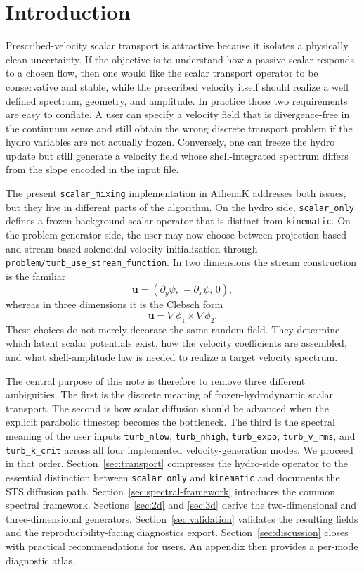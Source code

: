 \documentclass[twocolumn]{aastex7}
\newcommand{\code}[1]{\texttt{#1}}
\newcommand{\SO}{\code{scalar\_only}\xspace}
\newcommand{\kin}{\code{kinematic}\xspace}
\begin{document}
\section{Introduction}
Prescribed-velocity scalar transport is attractive because it isolates a physically clean uncertainty. If the objective is to understand how a passive scalar responds to a chosen flow, then one would like the scalar transport operator to be conservative and stable, while the prescribed velocity itself should realize a well defined spectrum, geometry, and amplitude. In practice those two requirements are easy to conflate. A user can specify a velocity field that is divergence-free in the continuum sense and still obtain the wrong discrete transport problem if the hydro variables are not actually frozen. Conversely, one can freeze the hydro update but still generate a velocity field whose shell-integrated spectrum differs from the slope encoded in the input file.

The present \code{scalar\_mixing} implementation in AthenaK addresses both issues, but they live in different parts of the algorithm. On the hydro side, \SO defines a frozen-background scalar operator that is distinct from \kin. On the problem-generator side, the user may now choose between projection-based and stream-based solenoidal velocity initialization through \code{problem/turb\_use\_stream\_function}. In two dimensions the stream construction is the familiar
\begin{equation}
\mathbf{u} = \left(\partial_y \psi,\,-\partial_x \psi,\,0\right),
\end{equation}
whereas in three dimensions it is the Clebsch form
\begin{equation}
\mathbf{u} = \nabla \phi_1 \times \nabla \phi_2.
\end{equation}
These choices do not merely decorate the same random field. They determine which latent scalar potentials exist, how the velocity coefficients are assembled, and what shell-amplitude law is needed to realize a target velocity spectrum.

The central purpose of this note is therefore to remove three different ambiguities. The first is the discrete meaning of frozen-hydrodynamic scalar transport. The second is how scalar diffusion should be advanced when the explicit parabolic timestep becomes the bottleneck. The third is the spectral meaning of the user inputs \code{turb\_nlow}, \code{turb\_nhigh}, \code{turb\_expo}, \code{turb\_v\_rms}, and \code{turb\_k\_crit} across all four implemented velocity-generation modes. We proceed in that order. Section~\ref{sec:transport} compresses the hydro-side operator to the essential distinction between \SO and \kin and documents the STS diffusion path. Section~\ref{sec:spectral-framework} introduces the common spectral framework. Sections~\ref{sec:2d} and \ref{sec:3d} derive the two-dimensional and three-dimensional generators. Section~\ref{sec:validation} validates the resulting fields and the reproducibility-facing diagnostics export. Section~\ref{sec:discussion} closes with practical recommendations for users. An appendix then provides a per-mode diagnostic atlas.
\end{document}
